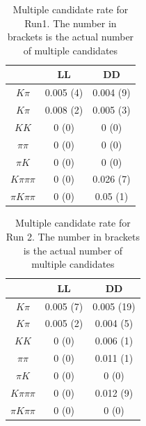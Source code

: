 \begin{table}[h]
\centering
\begin{tabular}{ccc}
\hline
& LL & DD \\
\hline
$K\pi$ & 0.005 (4) & 0.004 (9) \\
$K\pi$ & 0.008 (2) & 0.005 (3) \\
$KK$ & 0 (0) & 0 (0) \\
$\pi\pi$ & 0 (0) & 0 (0) \\
$\pi K$ & 0 (0) & 0 (0) \\
$K\pi\pi\pi$ & 0 (0) & 0.026 (7) \\
$\pi K\pi\pi$ & 0 (0) & 0.05 (1) \\
\hline
\end{tabular}
\caption{Multiple candidate rate for Run1. The number in brackets is the actual number of multiple candidates}
\label{multiplecandidatesRun1}
\end{table}

\begin{table}[h]
\centering
\begin{tabular}{ccc}
\hline
& LL & DD \\
\hline
$K\pi$ & 0.005 (7) & 0.005 (19) \\
$K\pi$ & 0.005 (2) & 0.004 (5) \\
$KK$ & 0 (0) & 0.006 (1) \\
$\pi\pi$ & 0 (0) & 0.011 (1) \\
$\pi K$ & 0 (0) & 0 (0) \\
$K\pi\pi\pi$ & 0 (0) & 0.012 (9) \\
$\pi K\pi\pi$ & 0 (0) & 0 (0) \\
\hline
\end{tabular}
\caption{Multiple candidate rate for Run 2. The number in brackets is the actual number of multiple candidates}
\label{multiplecandidatesRun2}
\end{table}

\clearpage
